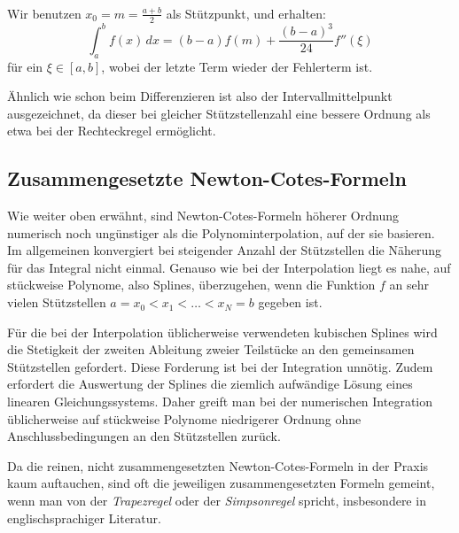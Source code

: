 \subsubsection{}
\begin{minipage}[t]{0.74\linewidth}
  Wir benutzen $x_0=m=\frac{a+b}{2}$ als Stützpunkt, und erhalten:
  \begin{equation}
    \int_a^b f(x)\, dx = (b-a) f(m) +
    \frac{(b-a)^3}{24} f''(\xi)
  \end{equation}
  für ein $\xi\in[a,b]$, wobei der letzte Term wieder der Fehlerterm
  ist.
\end{minipage}

Ähnlich wie schon beim Differenzieren ist also der
Intervallmittelpunkt ausgezeichnet, da dieser bei gleicher
Stützstellenzahl eine bessere Ordnung als etwa bei der Rechteckregel
ermöglicht.

\subsection{Zusammengesetzte Newton-Cotes-Formeln}

Wie weiter oben erwähnt, sind Newton-Cotes-Formeln höherer Ordnung
numerisch noch ungünstiger als die Polynominterpolation, auf der sie
basieren. Im allgemeinen konvergiert bei steigender Anzahl der
Stützstellen die Näherung für das Integral nicht einmal. Genauso wie
bei der Interpolation liegt es nahe, auf stückweise Polynome, also
Splines, überzugehen, wenn die Funktion $f$ an sehr vielen
Stützstellen $a=x_0< x_1 < \ldots < x_{N} = b$ gegeben ist.

Für die bei der Interpolation üblicherweise verwendeten kubischen
Splines wird die Stetigkeit der zweiten Ableitung zweier Teilstücke an
den gemeinsamen Stützstellen gefordert.  Diese Forderung ist bei der
Integration unnötig.  Zudem erfordert die Auswertung der Splines die
ziemlich aufwändige Lösung eines linearen Gleichungssystems.  Daher
greift man bei der numerischen Integration üblicherweise auf
stückweise Polynome niedrigerer Ordnung ohne Anschlussbedingungen an
den Stützstellen zurück.

Da die reinen, nicht zusammengesetzten Newton-Cotes-Formeln in der
Praxis kaum auftauchen, sind oft die jeweiligen zusammengesetzten
Formeln gemeint, wenn man von der \emph{Trapezregel} oder der
\emph{Simpsonregel} spricht, insbesondere in englischsprachiger
Literatur.

